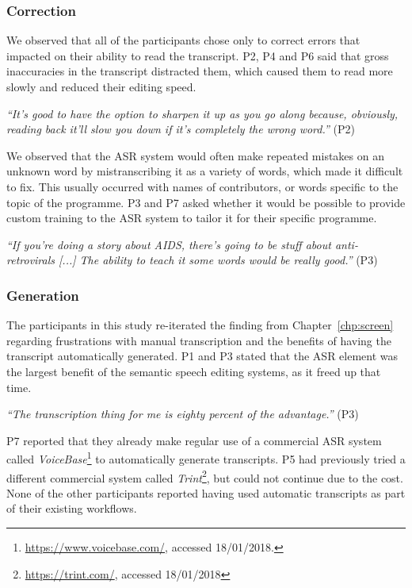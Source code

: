\subsubsection{Correction}

We observed that all of the participants chose only to correct errors that impacted on their ability to
read the transcript.  P2, P4 and P6 said that gross inaccuracies in the transcript distracted them, which caused them
to read more slowly and reduced their editing speed.

\textit{``It's good to have the option to sharpen it up as you go along because, obviously, reading back it'll slow
you down if it's completely the wrong word.''} (P2)


We observed that the ASR system would often make repeated mistakes on an unknown word by mistranscribing it
as a variety of words, which made it difficult to fix.  This usually occurred with names of contributors, or words
specific to the topic of the programme.  P3 and P7 asked whether it would be possible to provide custom training to the
ASR system to tailor it for their specific programme.

\textit{``If you're doing a story about AIDS, there's going to be stuff about anti-retrovirals [...]
The ability to teach it some words would be really good.''} (P3)


\subsubsection{Generation}

The participants in this study re-iterated the finding from Chapter~\ref{chp:screen} regarding frustrations with manual
transcription and the benefits of having the transcript automatically generated.
P1 and P3 stated that the ASR element was the largest benefit of the semantic speech editing systems, as it
freed up that time.

\textit{``The transcription thing for me is eighty percent of the advantage.''} (P3)

P7 reported that they already make regular use of a commercial ASR system called
\textit{VoiceBase}\footnote{\url{https://www.voicebase.com/}, accessed 18/01/2018.} to automatically generate
transcripts.  P5 had previously tried a different commercial system called
\textit{Trint}\footnote{\url{https://trint.com/}, accessed 18/01/2018}, but could not continue due to the cost. None of
the other participants reported having used automatic transcripts as part of their existing workflows.

